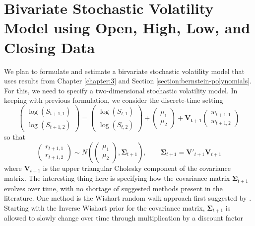 \section{Bivariate Stochastic Volatility Model using Open, High, Low, and Closing Data}

We plan to formulate and estimate a birvariate stochastic volatility model that uses results from Chapter \ref{chapter:3} and Section \ref{section:bernstein-polynomials}. For this, we need to specify a two-dimensional stochastic volatility model. In keeping with previous formulation, we consider the discrete-time setting
\begin{equation}
	\left( \begin{array}{c} \log(S_{t+1,1}) \\ \log( S_{t+1,2}) \end{array} \right) = \left( \begin{array}{c} \log(S_{t,1}) \\ \log( S_{t,2}) \end{array} \right) + \left( \begin{array}{c} \mu_1 \\ \mu_2 \end{array} \right) + \mathbf{V_{t+1}} \left( \begin{array}{c} w_{t+1,1} \\ w_{t+1,2} \end{array} \right) \label{eq:multivariate-SV}
\end{equation}
%
so that 
%
\begin{equation}
	\left( \begin{array}{c} r_{t+1,1} \\ r_{t+1,2} \end{array} \right) \sim N\left( \left( \begin{array}{c} \mu_1 \\ \mu_2 \end{array} \right), \boldsymbol{\Sigma}_{t+1 } \right), \qquad \boldsymbol{\Sigma}_{t+1} = \mathbf{V}'_{t+1} \mathbf{V}_{t+1}
\end{equation}
where $\mathbf{V}_{t+1}$ is the upper triangular Cholesky component of the covariance matrix.
%
The interesting thing here is specifying how the covariance matrix $\boldsymbol{\Sigma}_{t+1}$ evolves over time, with no shortage of suggested methods present in the literature. One method is the Wishart random walk approach first suggested by \cite{quintana1987multivariate}. Starting with the Inverse Wishart prior for the covariance matrix, $\boldsymbol{\Sigma}_{t+1}$ is allowed to slowly change over time through multiplication by a discount factor
